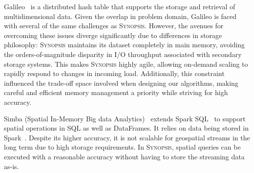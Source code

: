 Galileo~\cite{malensek2016analytic,malensek2015fast} is a distributed hash table that supports the storage and retrieval of multidimensional data. Given the overlap in problem domain, Galileo is faced with several of the same challenges as \textsc{Synopsis}. However, the avenues for overcoming these issues diverge significantly due to differences in storage philosophy: \textsc{Synopsis} maintains its dataset completely in main memory, avoiding the orders-of-magnitude disparity in I/O throughput associated with secondary storage systems. This makes \textsc{Synopsis} highly agile, allowing on-demand scaling to rapidly respond to changes in incoming load. Additionally, this constraint influenced the trade-off space involved when designing our algorithms, making careful and efficient memory management a priority while striving for high accuracy.

Simba (Spatial In-Memory Big data Analytics)~\cite{xiesimba} extends Spark SQL~\cite{armbrust2015spark} to support spatial operations in SQL as well as DataFrames. It relies on data being stored in Spark~\cite{zaharia2010spark}. Despite its higher accuracy, it is not scalable for geospatial streams in the long term due to high storage requirements. In \textsc{Synopsis}, spatial queries can be executed with a reasonable accuracy without having to store the streaming data as-is.

